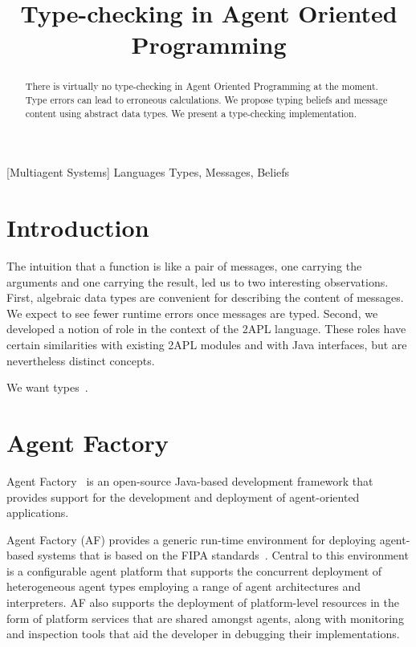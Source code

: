 \documentclass[preprint]{sigplanconf} %
\title{Type-checking in Agent Oriented Programming}
\begin{document}
\maketitle
\begin{abstract} %
There is virtually no type-checking in Agent Oriented Programming at the
moment. Type errors can lead to erroneous calculations. We propose typing
beliefs and message content using abstract data types. We present a type-checking implementation.

\end{abstract} %
[Multiagent Systems]
\terms Languages
\keywords Types, Messages, Beliefs

\section{Introduction} %
The intuition that a function is like a pair of messages, one carrying the
arguments and one carrying the result, led us to two interesting
observations. First, algebraic data types are convenient for describing the
content of messages. We expect to see fewer runtime errors once messages
are typed. Second, we developed a notion of role in the context of the 2APL
language. These roles have certain similarities with existing 2APL modules
and with Java interfaces, but are nevertheless distinct concepts.

We want types~\cite{DBLP:conf/ctcs/Hagino87}.

\section{Agent Factory} %
Agent Factory~\cite{collier2002agent} is an open-source Java-based
development framework that provides support for the development and
deployment of agent-oriented applications.

Agent Factory (AF) provides a generic run-time environment for deploying
agent-based systems that is based on the FIPA standards~\cite{poslad2000fipa}.
Central to this environment is a configurable agent platform that supports the
concurrent deployment of heterogeneous agent types employing a range of agent
architectures and interpreters. AF also supports the deployment of
platform-level resources in the form of platform services that are shared
amongst agents, along with monitoring and inspection tools that aid the
developer in debugging their implementations. 
\end{document}
